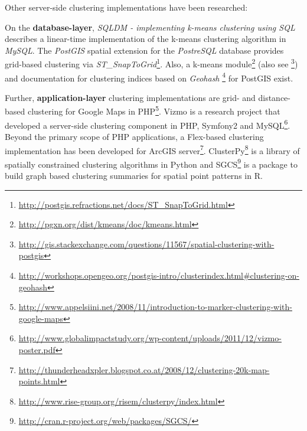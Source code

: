 Other server-side clustering implementations have been researched:

On the \textbf{database-layer}, \textit{SQLDM - implementing k-means clustering using SQL} describes a linear-time implementation of the k-means clustering algorithm in \textit{MySQL}\cite{Simha07sqldm}.
 The \textit{PostGIS} spatial extension for the \textit{PostreSQL} database provides grid-based clustering via \textit{ST\_SnapToGrid}\footnote{\url{http://postgis.refractions.net/docs/ST_SnapToGrid.html}}. Also, a k-means module\footnote{\url{http://pgxn.org/dist/kmeans/doc/kmeans.html}} (also see \footnote{\url{http://gis.stackexchange.com/questions/11567/spatial-clustering-with-postgis}}) and documentation for clustering indices based on \textit{Geohash} \footnote{\url{http://workshops.opengeo.org/postgis-intro/clusterindex.html\#clustering-on-geohash}} for PostGIS exist.

Further, \textbf{application-layer} clustering implementations are grid- and distance-based clustering for Google Maps in PHP\footnote{\url{http://www.appelsiini.net/2008/11/introduction-to-marker-clustering-with-google-maps}}. Vizmo is a research project that developed a server-side clustering component in PHP, Symfony2 and MySQL\footnote{\url{http://www.globalimpactstudy.org/wp-content/uploads/2011/12/vizmo-poster.pdf}}. Beyond the primary scope of PHP applications, a Flex-based clustering implementation has been developed for ArcGIS server\footnote{\url{http://thunderheadxpler.blogspot.co.at/2008/12/clustering-20k-map-points.html}}. ClusterPy\footnote{\url{http://www.rise-group.org/risem/clusterpy/index.html}} is a library of spatially constrained clustering algorithms in Python and SGCS\footnote{\url{http://cran.r-project.org/web/packages/SGCS/}} is a package to build graph based clustering summaries for spatial point patterns in R.





















